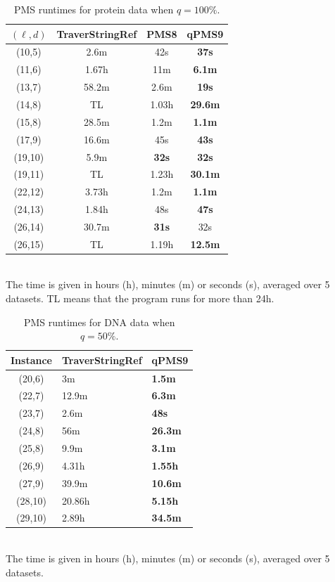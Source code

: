 \begin{table}
\caption{PMS runtimes for protein data when $q=100\%$.}
\label{timePmsProtein}
\begin{tabular}{| c | c | c | c |}
\hline
$(\ell,d)$ & TraverStringRef & PMS8 & qPMS9\\
\hline
(10,5) & 2.6m & 42s & \textbf{37s}\\
\hline
(11,6) & 1.67h & 11m & \textbf{6.1m}\\
\hline
(13,7) & 58.2m & 2.6m & \textbf{19s}\\
\hline
(14,8) & TL & 1.03h & \textbf{29.6m}\\
\hline
(15,8) & 28.5m & 1.2m & \textbf{1.1m}\\
\hline
(17,9) & 16.6m & 45s & \textbf{43s}\\
\hline
(19,10) & 5.9m & \textbf{32s} & \textbf{32s}\\
\hline
(19,11) & TL & 1.23h & \textbf{30.1m}\\
\hline
(22,12) & 3.73h & 1.2m & \textbf{1.1m}\\
\hline
(24,13) & 1.84h & 48s & \textbf{47s}\\
\hline
(26,14) & 30.7m & \textbf{31s} & 32s\\
\hline
(26,15) & TL & 1.19h & \textbf{12.5m}\\
\hline
\end{tabular}\\
 The time is given in
hours (h), minutes (m) or seconds (s), averaged over 5
datasets. TL means that the program runs for more than 24h.
\end{table}


\begin{table}
\caption{
PMS runtimes for DNA data when $q=50\%$.}\label{timePmsDNAq50}
\begin{tabular}{| c | l | l |}
\hline
Instance & TraverStringRef & qPMS9\\
\hline
(20,6) & 3m & \textbf{1.5m}\\
\hline
(22,7) & 12.9m & \textbf{6.3m}\\
\hline
(23,7) & 2.6m & \textbf{48s}\\
\hline
(24,8) & 56m & \textbf{26.3m}\\
\hline
(25,8) & 9.9m & \textbf{3.1m}\\
\hline
(26,9) & 4.31h & \textbf{1.55h}\\
\hline
(27,9) & 39.9m & \textbf{10.6m}\\
\hline
(28,10) & 20.86h & \textbf{5.15h}\\
\hline
(29,10) & 2.89h & \textbf{34.5m}\\
\hline
\end{tabular}\\
 The time is given in
hours (h), minutes (m) or seconds (s), averaged over 5
datasets.
\end{table}


